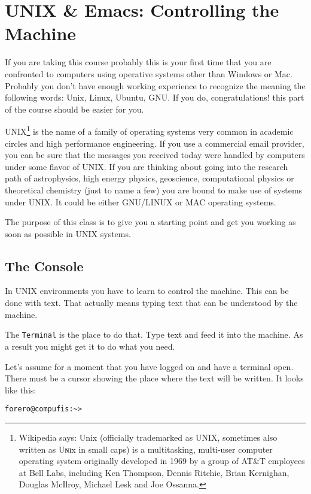 \documentclass{article}
\begin{document}
\section{UNIX \& Emacs: Controlling the Machine}

If you are taking this course probably this is your first time that you are confronted to computers using operative systems other than Windows or Mac. Probably you don't have enough working experience to recognize the meaning the following words: Unix, Linux, Ubuntu, GNU. If you do, congratulations! this part of the course should be easier for you.

UNIX\footnote{Wikipedia says: Unix (officially trademarked as UNIX, sometimes also written as Uɴɪx in small caps) is a multitasking, multi-user computer operating system originally developed in 1969 by a group of AT\&T employees at Bell Labs, including Ken Thompson, Dennis Ritchie, Brian Kernighan, Douglas McIlroy, Michael Lesk and Joe Ossanna.} is the name of a family of operating systems very common in academic circles and high performance engineering. If you use a commercial email provider, you can be sure that the messages you received today were handled by computers under some flavor of UNIX. If you are thinking about going into the research path of astrophysics, high energy physics, geoscience, computational physics or theoretical chemistry (just to name a few) you are bound to make use of systems under UNIX. It could be either GNU/LINUX or MAC operating systems.

The purpose of this class is to give you a starting point and get you working as soon as possible in UNIX systems.

\subsection{The Console}
In UNIX environments you have to learn to control the machine. This can be done with text. That actually means typing text that can be understood by the machine.

The {\tt Terminal} is the place to do that. Type text and feed it into the machine. As a result you might get it to do what you need. 

Let's assume for a moment that you have logged on and have a terminal open. There must be a cursor showing the place where the text will be written. It looks like this:

\begin{verbatim}
forero@compufis:~>
\end{verbatim}
\end{document}

